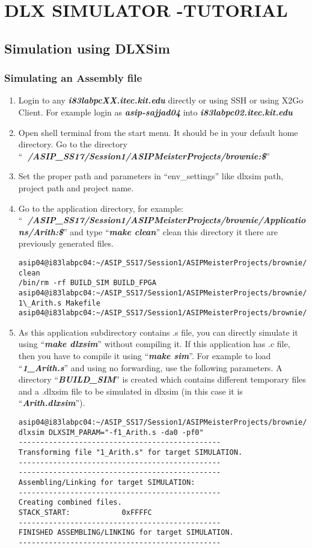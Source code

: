 \chapter*{DLX SIMULATOR -TUTORIAL}
\section*{Simulation using DLXSim}
\subsection{Simulating an Assembly file}
\begin{enumerate}
	\item Login to any \emph{\textbf{i83labpcXX.itec.kit.edu}} directly or using
	SSH or using X2Go Client. For example login as \emph{\textbf{asip-sajjad04}} into
	\emph{\textbf{i83labpc02.itec.kit.edu}}
	\item Open shell terminal from the start menu. It should be in your default
	home directory. Go to the directory
	``\emph{\textbf{~/ASIP\_SS17/Session1/ASIPMeisterProjects/brownie:\$}}''
	\item Set the proper path and parameters in ``env\_settings'' like dlxsim
	path, project path and project name.
	\item Go to the application directory, for example:
	``\emph{\textbf{~/ASIP\_SS17/Session1/ASIPMeisterProjects/brownie/Applications/Arith:\$}}''
	and type ``\emph{\textbf{make clean}}'' clean this directory it there
	are previously generated files.
\begin{lstlisting}
asip04@i83labpc04:~/ASIP_SS17/Session1/ASIPMeisterProjects/brownie/Applications/Arith:$make clean
/bin/rm -rf BUILD_SIM BUILD_FPGA
asip04@i83labpc04:~/ASIP_SS17/Session1/ASIPMeisterProjects/brownie/Applications/Arith:$ls
1\_Arith.s Makefile
asip04@i83labpc04:~/ASIP_SS17/Session1/ASIPMeisterProjects/brownie/Applications/Arith:$
\end{lstlisting}
	\item As this application subdirectory contains .s file, you can directly
	simulate it using ``\emph{\textbf{make dlxsim}}'' without compiling
	it. If this application has .c file, then you have to compile it using
	``\emph{\textbf{make sim}}''. For example to load
	``\emph{\textbf{1\_Arith.s}}'' and using no forwarding, use the
	following parameters. A directory ``\emph{\textbf{BUILD\_SIM}}'' is
	created which contains different temporary files and a .dlxsim file to
	be simulated in dlxsim (in this case it is
	``\emph{\textbf{Arith.dlxsim}}'').
\begin{lstlisting}
asip04@i83labpc04:~/ASIP_SS17/Session1/ASIPMeisterProjects/brownie/Applications/Arith:$make dlxsim DLXSIM_PARAM="-f1_Arith.s -da0 -pf0"
-----------------------------------------------
Transforming file "1_Arith.s" for target SIMULATION.
-----------------------------------------------
-----------------------------------------------
Assembling/Linking for target SIMULATION:
-----------------------------------------------
Creating combined files.
STACK_START:			0xFFFFC
-----------------------------------------------
FINISHED ASSEMBLING/LINKING for target SIMULATION.
-----------------------------------------------



\end{lstlisting}
\end{enumerate}
